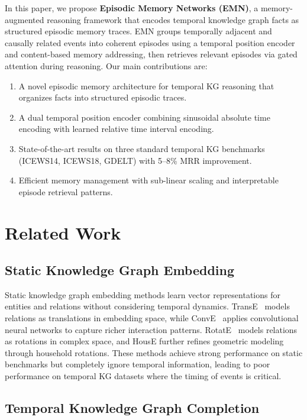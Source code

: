 \documentclass{article}
\begin{document}
In this paper, we propose \textbf{Episodic Memory Networks (EMN)}, a memory-augmented reasoning framework that encodes temporal knowledge graph facts as structured episodic memory traces. EMN groups temporally adjacent and causally related events into coherent episodes using a temporal position encoder and content-based memory addressing, then retrieves relevant episodes via gated attention during reasoning. Our main contributions are:
\begin{enumerate}
\item A novel episodic memory architecture for temporal KG reasoning that organizes facts into structured episodic traces.
\item A dual temporal position encoder combining sinusoidal absolute time encoding with learned relative time interval encoding.
\item State-of-the-art results on three standard temporal KG benchmarks (ICEWS14, ICEWS18, GDELT) with 5--8\% MRR improvement.
\item Efficient memory management with sub-linear scaling and interpretable episode retrieval patterns.
\end{enumerate}

\section{Related Work}
\label{sec:related}

\subsection{Static Knowledge Graph Embedding}

Static knowledge graph embedding methods learn vector representations for entities and relations without considering temporal dynamics. TransE~\citep{bordes2013transe} models relations as translations in embedding space, while ConvE~\citep{dettmers2018conve} applies convolutional neural networks to capture richer interaction patterns. RotatE~\citep{sun2019rotate} models relations as rotations in complex space, and HousE further refines geometric modeling through household rotations. These methods achieve strong performance on static benchmarks but completely ignore temporal information, leading to poor performance on temporal KG datasets where the timing of events is critical.

\subsection{Temporal Knowledge Graph Completion}
\end{document}
